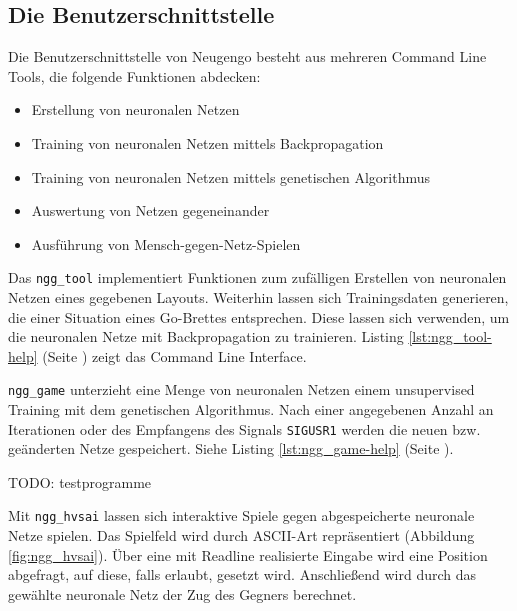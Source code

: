 \subsection{Die Benutzerschnittstelle}
Die Benutzerschnittstelle von Neugengo besteht aus mehreren Command Line Tools,
die folgende Funktionen abdecken:
\begin{itemize}
    \item Erstellung von neuronalen Netzen
    \item Training von neuronalen Netzen mittels Backpropagation
    \item Training von neuronalen Netzen mittels genetischen Algorithmus
    \item Auswertung von Netzen gegeneinander
    \item Ausführung von Mensch-gegen-Netz-Spielen
\end{itemize}

Das \texttt{ngg\_tool} implementiert Funktionen zum zufälligen Erstellen von
neuronalen Netzen eines gegebenen Layouts. Weiterhin lassen sich Trainingsdaten
generieren, die einer Situation eines Go-Brettes entsprechen. Diese lassen sich
verwenden, um die neuronalen Netze mit Backpropagation zu trainieren.
Listing \ref{lst:ngg_tool-help} (Seite \pageref{lst:ngg_tool-help}) zeigt das
Command Line Interface.

\texttt{ngg\_game} unterzieht eine Menge von neuronalen Netzen einem
unsupervised Training mit dem genetischen Algorithmus. Nach einer angegebenen
Anzahl an Iterationen oder des Empfangens des Signals \texttt{SIGUSR1} werden
die neuen bzw. geänderten Netze gespeichert.
Siehe Listing \ref{lst:ngg_game-help} (Seite \pageref{lst:ngg_game-help}).

TODO: testprogramme

Mit \texttt{ngg\_hvsai} lassen sich interaktive Spiele gegen abgespeicherte
neuronale Netze spielen. Das Spielfeld wird durch ASCII-Art repräsentiert
(Abbildung \ref{fig:ngg_hvsai}). Über eine mit Readline \cite{readline}
realisierte Eingabe wird eine Position abgefragt, auf diese, falls erlaubt,
gesetzt wird. Anschließend wird durch das gewählte neuronale Netz der Zug des
Gegners berechnet.

